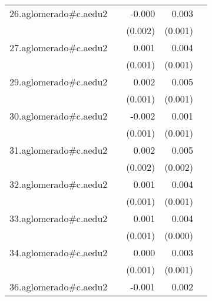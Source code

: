 {\begin{longtable}{l*{4}{D{.}{.}{-1}}}
\addlinespace
26.aglomerado#c.aedu2&                     &      -0.000         &       0.003         &                     \\
            &                     &     (0.002)         &     (0.001)         &                     \\
\addlinespace
27.aglomerado#c.aedu2&                     &       0.001         &       0.004\sym{***}&                     \\
            &                     &     (0.001)         &     (0.001)         &                     \\
\addlinespace
29.aglomerado#c.aedu2&                     &       0.002         &       0.005\sym{***}&                     \\
            &                     &     (0.001)         &     (0.001)         &                     \\
\addlinespace
30.aglomerado#c.aedu2&                     &      -0.002         &       0.001         &                     \\
            &                     &     (0.001)         &     (0.001)         &                     \\
\addlinespace
31.aglomerado#c.aedu2&                     &       0.002         &       0.005\sym{*}  &                     \\
            &                     &     (0.002)         &     (0.002)         &                     \\
\addlinespace
32.aglomerado#c.aedu2&                     &       0.001         &       0.004\sym{***}&                     \\
            &                     &     (0.001)         &     (0.001)         &                     \\
\addlinespace
33.aglomerado#c.aedu2&                     &       0.001         &       0.004\sym{***}&                     \\
            &                     &     (0.001)         &     (0.000)         &                     \\
\addlinespace
34.aglomerado#c.aedu2&                     &       0.000         &       0.003\sym{**} &                     \\
            &                     &     (0.001)         &     (0.001)         &                     \\
\addlinespace
36.aglomerado#c.aedu2&                     &      -0.001         &       0.002         &                     \\

\end{longtable}}
